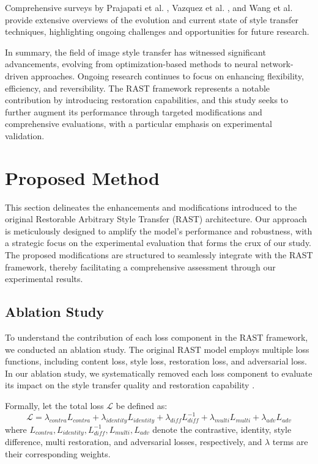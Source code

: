 \documentclass{article}
\begin{document}
Comprehensive surveys by Prajapati et al. \cite{Prajapati2020}, Vazquez et al. \cite{Vazquez2018}, and Wang et al. \cite{Wang2020} provide extensive overviews of the evolution and current state of style transfer techniques, highlighting ongoing challenges and opportunities for future research.

In summary, the field of image style transfer has witnessed significant advancements, evolving from optimization-based methods to neural network-driven approaches. Ongoing research continues to focus on enhancing flexibility, efficiency, and reversibility. The RAST framework represents a notable contribution by introducing restoration capabilities, and this study seeks to further augment its performance through targeted modifications and comprehensive evaluations, with a particular emphasis on experimental validation.

\section{Proposed Method}
\label{sec:proposed_method}

This section delineates the enhancements and modifications introduced to the original Restorable Arbitrary Style Transfer (RAST) architecture. Our approach is meticulously designed to amplify the model's performance and robustness, with a strategic focus on the experimental evaluation that forms the crux of our study. The proposed modifications are structured to seamlessly integrate with the RAST framework, thereby facilitating a comprehensive assessment through our experimental results.

\subsection{Ablation Study}
To understand the contribution of each loss component in the RAST framework, we conducted an ablation study. The original RAST model employs multiple loss functions, including content loss, style loss, restoration loss, and adversarial loss. In our ablation study, we systematically removed each loss component to evaluate its impact on the style transfer quality and restoration capability \cite{Liu2019, He2016}.

Formally, let the total loss \( \mathcal{L} \) be defined as:
\[
\mathcal{L} = \lambda_{contra} L_{contra} + \lambda_{identity} L_{identity} + \lambda_{diff} L^{-1}_{diff} + \lambda_{multi} L_{multi} + \lambda_{adv} L_{adv}
\]
where $L_{contra}, L_{identity}, L^{-1}_{diff}, L_{multi}, L_{adv}$ denote the contrastive, identity, style difference, multi restoration, and adversarial losses, respectively, and \( \lambda \) terms are their corresponding weights.
\end{document}

